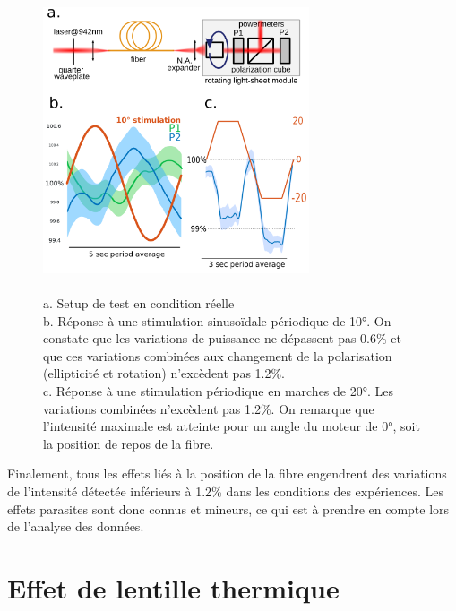 \begin{figure}
\centering
\includegraphics[width=0.7\textwidth]{./files/real-condition_intensity-variation.png}
\caption{
\\ a. Setup de test en condition réelle
\\ b. Réponse à une stimulation sinusoïdale périodique de 10°. On constate que les variations de puissance ne dépassent pas 0.6\% et que ces variations combinées aux changement de la polarisation (ellipticité et rotation) n'excèdent pas 1.2\%.
\\ c. Réponse à une stimulation périodique en marches de 20°. Les variations combinées n'excèdent pas 1.2\%. On remarque que l'intensité maximale est atteinte pour un angle du moteur de 0°, soit la position de repos de la fibre.
\label{FIGrealconditionsfiber}}
\end{figure}

Finalement, tous les effets liés à la position de la fibre engendrent des variations de l'intensité détectée inférieurs à 1.2\% dans les conditions des expériences. Les effets parasites sont donc connus et mineurs, ce qui est à prendre en compte lors de l'analyse des données.


\section{Effet de lentille thermique}

